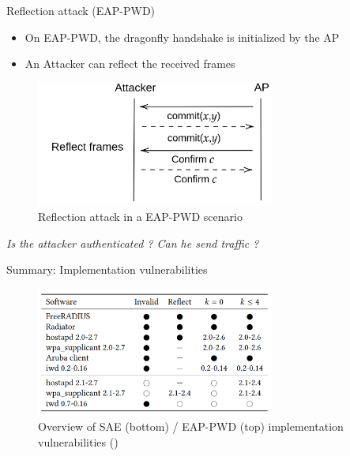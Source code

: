 \documentclass[xcolor=table]{bredelebeamer}
\begin{document}
\begin{frame}{Reflection attack (EAP-PWD)}
    \begin{itemize}
        \item On EAP-PWD, the dragonfly handshake is initialized by the AP
        \item An Attacker can reflect the received frames
    \end{itemize}
    \begin{figure}
        \centering
        \includegraphics[width=0.7\textwidth]{reflect.png}
        \caption{Reflection attack in a EAP-PWD scenario}
        \label{fig:my_label}
    \end{figure}
    \textit{\large{Is the attacker authenticated ? Can he send traffic ?}}
\end{frame}
\begin{frame}{Summary: Implementation vulnerabilities}
    \begin{figure}
        \centering
        \includegraphics[width=0.7\textwidth]{summary.png}
        \caption{Overview of SAE (bottom) / EAP-PWD (top) implementation vulnerabilities (\cite{vanhoef-sp2020-dragonblood})}
        \label{fig:my_label}
    \end{figure}
\end{frame}
\end{document}
